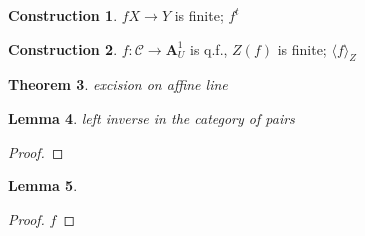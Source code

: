\documentclass[a4paper, oneside, english,reqno]{amsart}
\theoremstyle{plain}
\newtheorem{theorem}{Theorem}[section]
\newtheorem{lemma}[theorem]{Lemma}
\theoremstyle{definition}
\newtheorem{construction}[theorem]{Construction}
\theoremstyle{remark}
\newcommand{\A}{\mathbf{A}}
\begin{document}
\begin{construction}\label{con:transposeCor}
$f X\to Y$ is finite; $f^t$
\end{construction}

\begin{construction}\label{con:CorRelCurve}
$f\colon \mathcal C\to \A^1_U$ is q.f., $Z(f)$ is finite;
$\langle f\rangle_Z$
\end{construction}


\begin{theorem}
excision on affine line
\end{theorem}
\begin{lemma}
left inverse in the category of pairs
\end{lemma}
\begin{proof}

\end{proof}
\begin{lemma}

\end{lemma}
\begin{proof}
$f$
\end{proof}








\printbibliography
\end{document}

